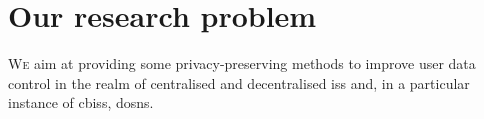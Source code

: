 \documentclass[showtrims, oldfontcommands]{kthesis}
\begin{document}
%
%
%
%





\chapter{Our research problem}
    \label{chapter:our-research-problem}


\lettrine{\textcolor[gray]{.25}{W}}{e} aim at providing some privacy-preserving 
methods to improve user data control in the realm of centralised and decentralised 
\acp{is} and, in a particular instance of \acp{cbis}, \acp{dosn}.
\end{document}
